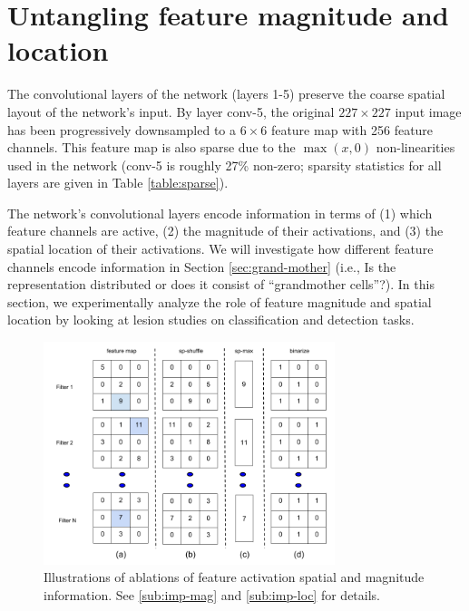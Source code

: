 \section{Untangling feature magnitude and location}
\label{sec-where-info}
The convolutional layers of the network (layers 1-5) preserve the coarse spatial layout of the network's input.
By layer conv-5, the original $227 \times 227$ input image has been progressively downsampled to a $6 \times 6$ feature map with 256 feature channels.
This feature map is also sparse due to the $\max(x, 0)$ non-linearities used in the network (conv-5 is roughly 27\% non-zero; sparsity statistics for all layers are given in Table \ref{table:sparse}).

The network's convolutional layers encode information in terms of (1) which feature channels are active, (2) the magnitude of their activations, and (3) the spatial location of their activations.
We will investigate how different feature channels encode information in Section \ref{sec:grand-mother} (i.e., Is the representation distributed or does it consist of ``grandmother cells''?).
In this section, we experimentally analyze the role of feature magnitude and spatial location by looking at lesion studies on classification and detection tasks.

\begin{figure}[t!]
\centering
\includegraphics[height=6.5cm]{images/features1.png}
\caption{Illustrations of ablations of feature activation spatial and magnitude information.
See \ref{sub:imp-mag} and \ref{sub:imp-loc} for details. }
\label{fig:features}
\end{figure}

